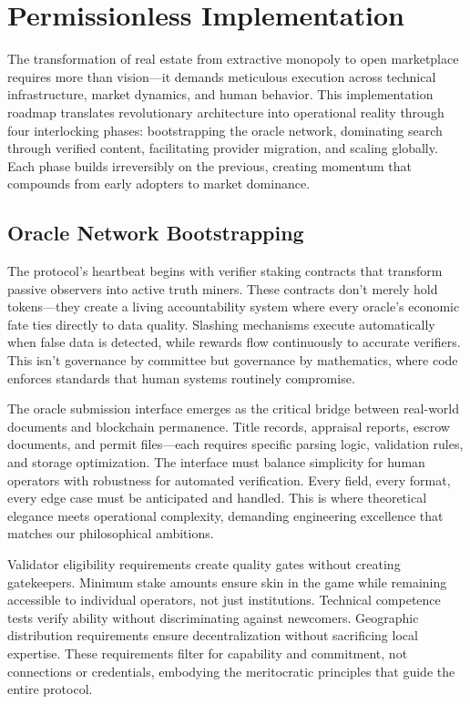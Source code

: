 \chapter{Permissionless Implementation}

The transformation of real estate from extractive monopoly to open marketplace requires more than vision—it demands meticulous execution across technical infrastructure, market dynamics, and human behavior. This implementation roadmap translates revolutionary architecture into operational reality through four interlocking phases: bootstrapping the oracle network, dominating search through verified content, facilitating provider migration, and scaling globally. Each phase builds irreversibly on the previous, creating momentum that compounds from early adopters to market dominance.

\section{Oracle Network Bootstrapping}

The protocol's heartbeat begins with verifier staking contracts that transform passive observers into active truth miners. These contracts don't merely hold tokens—they create a living accountability system where every oracle's economic fate ties directly to data quality. Slashing mechanisms execute automatically when false data is detected, while rewards flow continuously to accurate verifiers. This isn't governance by committee but governance by mathematics, where code enforces standards that human systems routinely compromise.

The oracle submission interface emerges as the critical bridge between real-world documents and blockchain permanence. Title records, appraisal reports, escrow documents, and permit files—each requires specific parsing logic, validation rules, and storage optimization. The interface must balance simplicity for human operators with robustness for automated verification. Every field, every format, every edge case must be anticipated and handled. This is where theoretical elegance meets operational complexity, demanding engineering excellence that matches our philosophical ambitions.

Validator eligibility requirements create quality gates without creating gatekeepers. Minimum stake amounts ensure skin in the game while remaining accessible to individual operators, not just institutions. Technical competence tests verify ability without discriminating against newcomers. Geographic distribution requirements ensure decentralization without sacrificing local expertise. These requirements filter for capability and commitment, not connections or credentials, embodying the meritocratic principles that guide the entire protocol.

